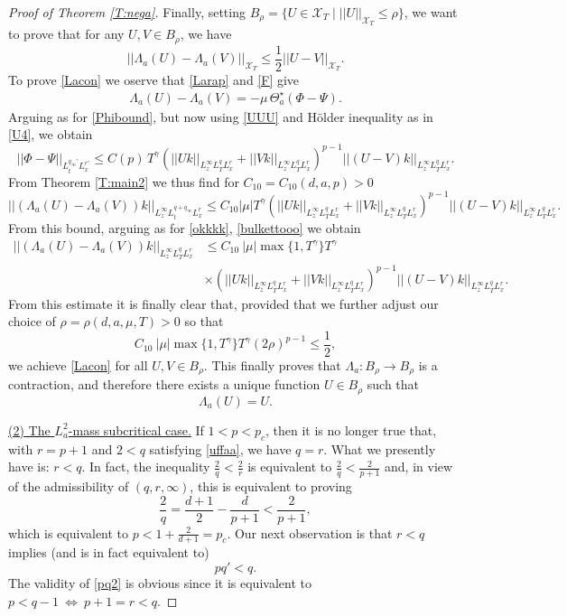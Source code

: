 \documentclass[11pt,letter]{amsart}
\numberwithin{equation}{section}
\newcommand{\XT}{\mathcal{X}_T}
\numberwithin{equation}{section}
\begin{document}
\begin{proof}[Proof of Theorem \ref{T:nega}]
Finally, setting $B_\rho = \{U\in \XT\mid ||U||_{\XT}\le \rho\}$, we want to prove that for any $U, V\in B_\rho$, we have
\begin{equation}\label{Lacon}
||\Lambda_a(U) - \Lambda_a(V)||_{\XT} \le \frac 12 ||U - V||_{\XT}.
\end{equation}
To prove \eqref{Lacon} we oserve that \eqref{Larap} and \eqref{F} give 
\begin{align}\label{Larap2}
\Lambda_a(U) - \Lambda_a(V) = -\mu\, \Theta_a^\star\left(\Phi - \Psi\right).
\end{align}
Arguing as for \eqref{Phibound}, but now using \eqref{UUU} and H\"older inequality as in \eqref{U4}, we obtain
\[
||\Phi - \Psi||_{L^{q_\infty'}_t L_x^{r'}} \le C(p)\, T^{\gamma} \left(||U k||_{L^\infty_z L^q_T L^r_x } + ||V k||_{L^\infty_z L^q_T L^r_x }\right)^{p-1} ||(U-V) k||_{L^\infty_z L^q_T L^r_x }.
\]
From Theorem \ref{T:main2} we thus find for $C_{10} = C_{10}(d,a,p)>0$
\[
||(\Lambda_a(U) - \Lambda_a(V))k||_{L^\infty_z L^{q+q_\infty}_t L^r_x } \le  C_{10} |\mu| T^{\gamma} \left(||U k||_{L^\infty_z L^q_T L^r_x } + ||V k||_{L^\infty_z L^q_T L^r_x }\right)^{p-1} ||(U - V)k||_{L^\infty_z L^q_T L^r_x }.
\]
From this bound, arguing as for \eqref{okkkk}, \eqref{bulkettooo}
we obtain
\begin{align*}
||(\Lambda_a(U) - \Lambda_a(V)) k||_{L^\infty_z L^{q}_T L^r_x } & \le  C_{10}\ |\mu| \max\{1,T^{\gamma}\} T^{\gamma}\\
& \times \left(||Uk||_{L^\infty_z L^q_T L^r_x } + ||Vk||_{L^\infty_z L^q_T L^r_x }\right)^{p-1} ||(U - V)k||_{L^\infty_z L^q_T L^r_x }.
\end{align*}
From this estimate it is finally clear that, provided that we further adjust our choice of $\rho = \rho(d,a,\mu,T)>0$ so that
\[
C_{10}\ |\mu| \max\{1,T^{\gamma}\} T^{\gamma} (2\rho)^{p-1} \le \frac 12,
\]
we achieve \eqref{Lacon} for all $U, V\in B_\rho$. This finally proves that $\Lambda_a : B_\rho\to B_\rho$ is a contraction, and therefore there exists a unique function $U\in B_\rho$ such that 
\[
\Lambda_a(U) = U.
\]

\medskip 

\noindent \underline{(2) The $L^2_a$-mass subcritical case.} If $1<p < p_c$, then it is no longer true that, with $r = p+1$ and $2<q$ satisfying \eqref{uffaa}, we have $q = r$. What we presently have is: $r<q$. In fact, the inequality $\frac 2q < \frac 2r$ is equivalent to $\frac 2q < \frac{2}{p+1}$ and, in view of the admissibility of $(q,r,\infty)$, this is equivalent to proving
\[
\frac 2q = \frac{d+1}2 - \frac{d}{p+1} < \frac{2}{p+1},
\]
which is equivalent to $p < 1 + \frac{2}{d+1} = p_c$. Our next observation is that $r<q$ implies (and is in fact equivalent to)
\begin{equation}\label{pq2}
p q' < q.
\end{equation}
The validity of \eqref{pq2} is obvious since it is equivalent to $p<q-1\ \Longleftrightarrow\  p+1 = r <q$. 


\end{proof}
\end{document}
